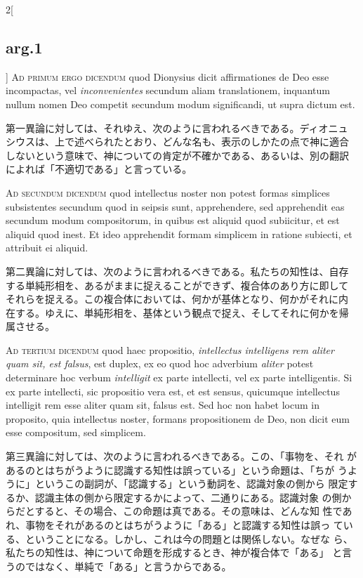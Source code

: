 \documentclass[paper=a4paper,fontsize=10pt,jafontsize=9pt,titlepage]{jlreq}
\begin{document}
\begin{paracol}{2}[\subsection{arg.1}]
{\scshape Ad primum ergo dicendum} quod Dionysius dicit affirmationes
de Deo esse incompactas, vel {\itshape inconvenientes} secundum aliam
translationem, inquantum nullum nomen Deo competit secundum modum
significandi, ut supra dictum est.

\switchcolumn

第一異論に対しては、それゆえ、次のように言われるべきである。ディオニュ
シウスは、上で述べられたとおり、どんな名も、表示のしかたの点で神に適合
しないという意味で、神についての肯定が不確かである、あるいは、別の翻訳
によれば「不適切である」と言っている。

\switchcolumn*[\subsection{ad.2}]

{\scshape Ad secundum dicendum} quod intellectus noster non potest
formas simplices subsistentes secundum quod in seipsis sunt,
apprehendere, sed apprehendit eas secundum modum compositorum, in
quibus est aliquid quod subiicitur, et est aliquid quod inest. Et ideo
apprehendit formam simplicem in ratione subiecti, et attribuit ei
aliquid.

\switchcolumn

第二異論に対しては、次のように言われるべきである。私たちの知性は、自存
する単純形相を、あるがままに捉えることができず、複合体のあり方に即して
それらを捉える。この複合体においては、何かが基体となり、何かがそれに内
在する。ゆえに、単純形相を、基体という観点で捉え、そしてそれに何かを帰
属させる。

\switchcolumn*[\subsection{ad.3}]

{\scshape Ad tertium dicendum} quod haec propositio, {\itshape
intellectus intelligens rem aliter quam sit, est falsus}, est duplex,
ex eo quod hoc adverbium {\itshape aliter} potest determinare hoc
verbum {\itshape intelligit} ex parte intellecti, vel ex parte
intelligentis. Si ex parte intellecti, sic propositio vera est, et est
sensus, quicumque intellectus intelligit rem esse aliter quam sit,
falsus est. Sed hoc non habet locum in proposito, quia intellectus
noster, formans propositionem de Deo, non dicit eum esse compositum,
sed simplicem.

\switchcolumn

第三異論に対しては、次のように言われるべきである。この、「事物を、それ
があるのとはちがうように認識する知性は誤っている」という命題は、「ちが
うように」というこの副詞が、「認識する」という動詞を、認識対象の側から
限定するか、認識主体の側から限定するかによって、二通りにある。認識対象
の側からだとすると、その場合、この命題は真である。その意味は、どんな知
性であれ、事物をそれがあるのとはちがうように「ある」と認識する知性は誤っ
ている、ということになる。しかし、これは今の問題とは関係しない。なぜな
ら、私たちの知性は、神について命題を形成するとき、神が複合体で「ある」
と言うのではなく、単純で「ある」と言うからである。


\end{paracol}
\end{document}
